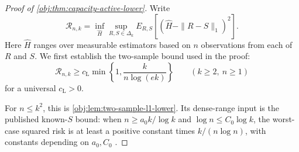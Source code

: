 \documentclass[11pt]{article}
\begin{document}
\begin{proof}[Proof of \cref{obj:thm:capacity-active-lower}]
Write
\[
\mathcal R_{n,k}
=\inf_{\widehat H}\sup_{R,S\in\Delta_k}
E_{R,S}\!\left[(\widehat H-\|R-S\|_1)^2\right].
\] %
Here \(\widehat H\) ranges over measurable estimators based on \(n\) observations from each of \(R\) and \(S\). We first establish the two-sample bound used in the proof:
\[
\mathcal R_{n,k}\ge c_{\mathrm L}
\min\left\{1,\frac{k}{n\log(ek)}\right\}
\qquad(k\ge2,\ n\ge1)
\]
for a universal \(c_{\mathrm L}>0\). %

For \(n\le k^2\), this is \cref{obj:lem:two-sample-l1-lower}. Its dense-range input is the published known-\(S\) bound: when \(n\ge a_0k/\log k\) and \(\log n\le C_0\log k\), the worst-case squared risk is at least a positive constant times \(k/(n\log n)\), with constants depending on \(a_0,C_0\) \citep[Theorem 3 and the unknown-both-distributions reduction following Theorem 6]{JiaoHanWeissman2018}. %


\end{proof}
\end{document}
